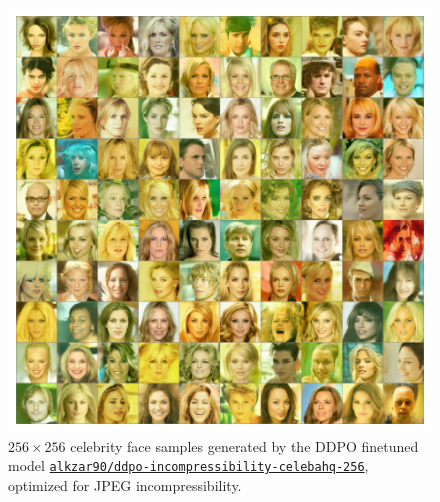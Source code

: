 \begin{appendixs}
        \begin{figure}
            \centering
            \includegraphics[scale=0.8]{img/results/ddpo-incompressibility-samples.png}
            \vspace{-4pt}  %
            \captionsetup{width=\textwidth} %
            \caption{$256\times256$ celebrity face samples generated by the DDPO finetuned model \href{https://huggingface.co/alkzar90/ddpo-incompressibility-celebahq-256}{\texttt{\texttt{alkzar90/ddpo-incompressibility-celebahq-256}}}, optimized for JPEG incompressibility.}
            \label{fig:ddpo-incompressibility-samples}
        \end{figure}


\end{appendixs}
